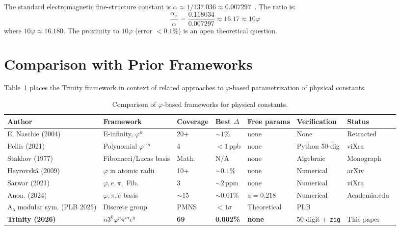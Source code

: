 \documentclass[10pt,a4paper]{article}
\begin{document}
The standard electromagnetic fine-structure constant is $\alpha \approx 1/137.036 \approx 0.007297$~\cite{PDG2024}.
The ratio is:
\begin{equation}
  \frac{\alpha_\varphi}{\alpha} = \frac{0.118034}{0.007297} \approx 16.17 \approx 10\varphi
  \label{eq:ratio}
\end{equation}
where $10\varphi \approx 16.180$. The proximity to $10\varphi$ (error $< 0.1\%$) is an open
theoretical question.

\medskip

\section*{Comparison with Prior Frameworks}

Table~\ref{tab:comparison} places the Trinity framework in context of related approaches
to $\varphi$-based parametrization of physical constants.

\begin{table}[h!]
\centering
\caption{Comparison of $\varphi$-based frameworks for physical constants.}
\label{tab:comparison}
\begin{tabular}{@{}lllllll@{}}
\toprule
Author & Framework & Coverage & Best $\Delta$ & Free params & Verification & Status \\
\midrule
El Naschie (2004) & E-infinity, $\varphi^n$ & 20+ & $\sim 1\%$ & none & None & Retracted~\cite{naschie1979} \\
Pellis (2021) & Polynomial $\varphi^{-n}$ & 4 & $< 1$\,ppb & none & Python 50-dig & viXra~\cite{chimera2026} \\
Stakhov (1977) & Fibonacci/Lucas basis & Math. & N/A & none & Algebraic & Monograph~\cite{stakhov1970} \\
Heyrovsk\'{a} (2009) & $\varphi$ in atomic radii & 10+ & $\sim 0.1\%$ & none & Numerical & arXiv~\cite{heyrovskaya2010} \\
Sarwar (2021) & $\varphi, e, \pi,$ Fib. & 3 & $\sim 2$\,ppm & none & Numerical & viXra \\
Anon. (2024) & $\varphi, \pi, e$ basis & $\sim$15 & $\sim 0.01\%$ & $a=0.218$ & Numerical & Academia.edu~\cite{aca2024} \\
A$_5$ modular sym. (PLB 2025) & Discrete group & PMNS & $<1\sigma$ & Theoretical & PLB~\cite{PLB2025} \\
\textbf{Trinity (2026)} & $n3^k\varphi^p\pi^m e^q$ & \textbf{69} & \textbf{0.002\%} & \textbf{none} & 50-digit + \texttt{zig} & This paper \\
\bottomrule
\end{tabular}
\end{table}
\end{document}
